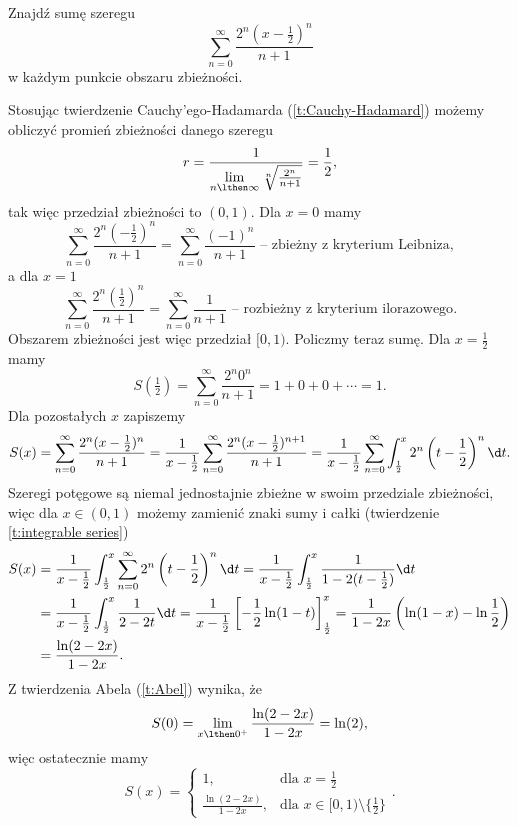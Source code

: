 \begin{example}
    Znajdź sumę szeregu
    \[ \sum_{n=0}^\infty \frac{2^n(x - \frac{1}{2})^n}{n+1} \]
    w każdym punkcie obszaru zbieżności.
\end{example}
\begin{solution}
    Stosując twierdzenie Cauchy'ego-Hadamarda (\ref{t:Cauchy-Hadamard}) możemy obliczyć promień zbieżności danego szeregu
    \[ r = \frac{1}{\lim\limits_{n\lthen\infty}\sqrt[n]{\frac{2^n}{n+1}}} = \frac{1}{2}, \]
    tak więc przedział zbieżności to $(0, 1)$.
    Dla $x = 0$ mamy
    \[ \sum_{n=0}^\infty \frac{2^n\left(-\frac{1}{2}\right)^n}{n+1} = \sum_{n=0}^\infty \frac{(-1)^n}{n+1} \text{ -- zbieżny z kryterium Leibniza}, \]
    a dla $x = 1$
    \[ \sum_{n=0}^\infty \frac{2^n\left(\frac{1}{2}\right)^n}{n+1} = \sum_{n=0}^\infty \frac{1}{n+1} \text{ -- rozbieżny z kryterium ilorazowego}. \]
    Obszarem zbieżności jest więc przedział $[0, 1)$. Policzmy teraz sumę. Dla $x = \frac{1}{2}$ mamy
    \[ S(\tfrac{1}{2}) = \sum_{n=0}^\infty \frac{2^n0^n}{n+1} = 1 + 0 + 0 + \cdots = 1. \]
    Dla pozostałych $x$ zapiszemy
    \[ S(x) = \sum_{n=0}^\infty \frac{2^n(x - \frac{1}{2})^n}{n+1} = \frac{1}{x - \frac{1}{2}}\sum_{n=0}^\infty \frac{2^n(x - \frac{1}{2})^{n+1}}{n+1} = \frac{1}{x - \frac{1}{2}}\sum_{n=0}^\infty \int_{\frac{1}{2}}^x 2^n\left(t-\frac{1}{2}\right)^n\d t. \]
    Szeregi potęgowe są niemal jednostajnie zbieżne w swoim przedziale zbieżności, więc dla $x \in (0, 1)$ możemy zamienić znaki sumy i całki (twierdzenie \ref{t:integrable series})
    \begin{align*}
        S(x) &= \frac{1}{x - \frac{1}{2}}\int_{\frac{1}{2}}^x \sum_{n=0}^\infty 2^n\left(t-\frac{1}{2}\right)^n\d t = \frac{1}{x - \frac{1}{2}}\int_{\frac{1}{2}}^x \frac{1}{1 - 2(t - \frac{1}{2})}\d t \\
        &= \frac{1}{x - \frac{1}{2}}\int_{\frac{1}{2}}^x \frac{1}{2 - 2t}\d t = \frac{1}{x - \frac{1}{2}}\left[-\frac{1}{2}\ln(1 - t)\right]_{\frac{1}{2}}^x = \frac{1}{1 - 2x}\left(\ln(1 - x) - \ln{\frac{1}{2}}\right) \\
        &= \frac{\ln(2 - 2x)}{1 - 2x}.
    \end{align*}
    Z twierdzenia Abela (\ref{t:Abel}) wynika, że
    \[ S(0) = \lim_{x\lthen 0^+}\frac{\ln(2 - 2x)}{1 - 2x} = \ln(2), \]
    więc ostatecznie mamy
    \[ S(x) = \begin{cases}1, & \text{dla } x = \tfrac{1}{2} \\ \frac{\ln(2 - 2x)}{1 - 2x}, & \text{dla } x \in [0, 1)\setminus \{\tfrac{1}{2}\} \end{cases}. \]
\end{solution}

